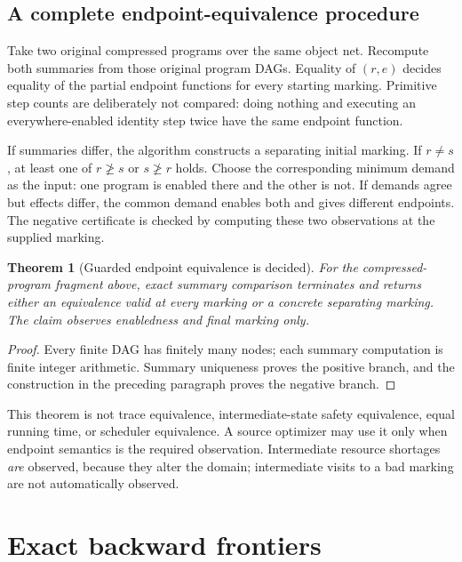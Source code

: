 \documentclass[11pt,a4paper]{article}
\newtheorem{theorem}{Theorem}[section]
\theoremstyle{definition}
\theoremstyle{remark}
\begin{document}
\subsection{A complete endpoint-equivalence procedure}\label{sec:equiv}
Take two original compressed programs over the same object net. Recompute both summaries from those original program DAGs. Equality of $(r,e)$ decides equality of the partial endpoint functions for every starting marking. Primitive step counts are deliberately not compared: doing nothing and executing an everywhere-enabled identity step twice have the same endpoint function.

If summaries differ, the algorithm constructs a separating initial marking. If $r\ne s$, at least one of $r\not\ge s$ or $s\not\ge r$ holds. Choose the corresponding minimum demand as the input: one program is enabled there and the other is not. If demands agree but effects differ, the common demand enables both and gives different endpoints. The negative certificate is checked by computing these two observations at the supplied marking.

\begin{theorem}[Guarded endpoint equivalence is decided]
For the compressed-program fragment above, exact summary comparison terminates and returns either an equivalence valid at every marking or a concrete separating marking. The claim observes enabledness and final marking only.
\end{theorem}
\begin{proof}
Every finite DAG has finitely many nodes; each summary computation is finite integer arithmetic. Summary uniqueness proves the positive branch, and the construction in the preceding paragraph proves the negative branch.
\end{proof}
This theorem is not trace equivalence, intermediate-state safety equivalence, equal running time, or scheduler equivalence. A source optimizer may use it only when endpoint semantics is the required observation. Intermediate resource shortages \emph{are} observed, because they alter the domain; intermediate visits to a bad marking are not automatically observed.

\section{Exact backward frontiers}\label{sec:frontier}
\end{document}
